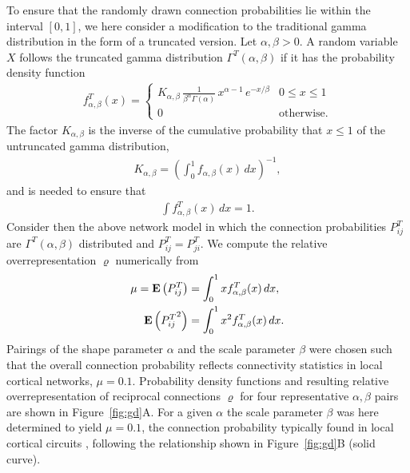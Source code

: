 To ensure that the randomly drawn connection probabilities lie within the
interval $[0,1]$, we here consider a modification to the
traditional gamma distribution in the form of a truncated version. Let
$\alpha, \beta > 0$. A random variable $X$ follows the truncated gamma
distribution $\Gamma^T(\alpha, \beta)$ if it has the probability
density function
%
\begin{align}
  f_{\alpha,\beta}^T(x) = \begin{cases} K_{\alpha, \beta}\,
\frac{1}{\beta^{\alpha}\Gamma(\alpha)}\, x^{\alpha-1}\,e^{-x/\beta} & 0 \leq x \leq 1 \\
0 & \text{otherwise}.
\end{cases} \label{eq:fTab}
\end{align}
%
The factor $K_{\alpha,\beta}$ is the inverse of the cumulative
probability that $x \leq 1$ of the untruncated gamma distribution,
\begin{align}
  K_{\alpha,\beta} = \left(\int_0^{1} f_{\alpha,\beta}(x) \, dx \right)^{-1},
\end{align}
and is needed to ensure that
\begin{align}
  \int f_{\alpha,\beta}^T(x) \,dx = 1 \label{eq:gd1}.
\end{align}
Consider then the above network model in which the connection
probabilities $P_{ij}^T$ are $\Gamma^T(\alpha, \beta)$ distributed and $P_{ij}^T = P_{ji}^T$. We
compute the relative overrepresentation $\varrho$ numerically from
\begin{align}
  \mu = \operatorname{\mathbf{E}}\left(P_{ij}^T\right) &= \int_0^1 x f_{\alpha,\beta}^T(x)\, dx,\\
        \operatorname{\mathbf{E}}\left({P_{ij}^T}^2\right) &= \int_0^1 x^2 f_{\alpha,\beta}^T(x)\, dx.
\end{align}
%
Pairings of the shape parameter $\alpha$ and the scale parameter
$\beta$ were chosen such that the overall connection probability
reflects connectivity statistics in local cortical networks, $\mu =
0.1$. Probability density functions and resulting relative
overrepresentation of reciprocal connections $\varrho$ for four
representative $\alpha,\beta$ pairs are shown in
Figure~\ref{fig:gd}A. For a given $\alpha$ the scale parameter $\beta$
was here determined to yield $\mu =0.1$, the connection probability
typically found in local cortical circuits \cite{Song2005,
  Thomson2002}, following the relationship shown in
Figure~\ref{fig:gd}B (solid curve).
\vspace{0.2cm}


